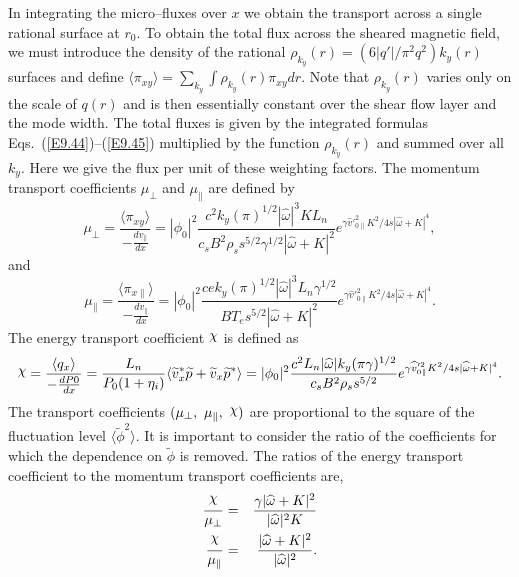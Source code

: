 \documentclass[a4paper,openany,12pt]{book}
\def\chix{\raise.5ex\hbox{$\chi$}}
\begin{document}
{In integrating the micro--fluxes over $x$ we obtain the transport across a single rational surface at $r_0$. To obtain the total flux across the sheared magnetic field, we must introduce the density of the rational 
$\rho_{k_y}(r)=(6|q'|/\pi^2q^2)k_y(r)$ surfaces and define $\langle\pi_{xy}\rangle=\sum_{k_y}\int\rho_{k_y}(r)\pi_{xy}dr$. Note that $\rho_{k_y}(r)$ varies only on the scale of $q(r)$ and is then essentially constant over the shear flow layer and the mode width. The total fluxes is given by the integrated formulas Eqs.~(\ref{E9.44})--(\ref{E9.45}) multiplied by the function $\rho_{k_y}(r)$ and summed over all $k_y$. Here we give the flux per unit of these weighting factors. The momentum transport coefficients $\mu_\perp$ and $\mu_\|$ are defined by
\begin{equation}
\mu_\perp=\frac{\langle\pi_{xy}\rangle}{-\frac{dv_\|}{dx}}=|\phi_0|^2
\frac{c^2 k_y(\pi)^{1/2}|\widehat\omega|^3KL_n}{c_s B^2\rho_s s^{5/2}\gamma^{1/2}|\widehat\omega+K|^2} e^{\gamma\widehat v'^2_{0\|}K^2/4s|\widehat\omega+K|^4},\label{E9.47}
\end{equation}
and
\begin{equation}
\mu_\|=\frac{\langle\pi_{x\|}\rangle}{-\frac{dv_\|}{dx}}=|\phi_0|^2
\frac{cek_y(\pi)^{1/2}|\widehat\omega|^3L_n\gamma^{1/2}}{BT_e s^{5/2}|\widehat\omega+K|^2}e^{\gamma\widehat v'^2_{0\|} K^2/4s|\widehat\omega+K|^4}.\label{E9.48}
\end{equation}
The energy transport coefficient $\chix$ is defined as
\begin{equation}
 \chix=\frac{\langle q_x\rangle}{-\frac{dP0}{dx}}=\frac{L_n}{P_0(1+\eta_i)}\langle\widetilde v_x^*\widetilde p+\widetilde v_x\widetilde p^*\rangle=|\phi_0|^2
\frac{c^2 L_n|\widehat\omega|k_y(\pi\gamma)^{1/2}}
{c_s B^2\rho_s s^{5/2}} e^{\gamma\widehat v'^2_{0\|} K^2/4s|\widehat\omega+K|^4}.\label{E9.49}
\end{equation}
The transport coefficients $(\mu_\perp,\ \mu_\|,\ \chix)$ are proportional to the square of the fluctuation level 
$\langle\widetilde\phi^2\rangle$. It is important to consider the ratio of the coefficients for which the dependence on $\widetilde\phi$ is removed. The ratios of the energy transport coefficient to the momentum transport coefficients are,
\begin{eqnarray}
\frac{\chix}{\mu_\perp}&=&\frac{\gamma|\widehat\omega+K|^2}{|\widehat\omega|^2K}\label{E9.50}\\
\frac{\chix}{\mu_\|}&=&\frac{|\widehat\omega+K|^2}{|\widehat\omega|^2}.\label{E9.51}
\end{eqnarray}
}
\end{document}
